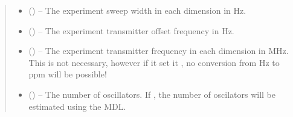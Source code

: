 \documentclass[letterpaper,10pt,english]{sphinxmanual}
\begin{document}
\begin{fulllineitems}
\begin{quote}
\begin{description}
\begin{itemize}
\item {} 
\sphinxAtStartPar
{} (\sphinxstyleliteralemphasis{\sphinxupquote{{[}}}\sphinxstyleliteralemphasis{\sphinxupquote{{]} or }}\sphinxstyleliteralemphasis{\sphinxupquote{{[}}}\sphinxstyleliteralemphasis{\sphinxupquote{, }}\sphinxstyleliteralemphasis{\sphinxupquote{{]}}}) – The experiment sweep width in each dimension in Hz.

\item {} 
\sphinxAtStartPar
{} (\sphinxstyleliteralemphasis{\sphinxupquote{{[}}}\sphinxstyleliteralemphasis{\sphinxupquote{{]}}}\sphinxstyleliteralemphasis{\sphinxupquote{, }}\sphinxstyleliteralemphasis{\sphinxupquote{{[}}}\sphinxstyleliteralemphasis{\sphinxupquote{, }}\sphinxstyleliteralemphasis{\sphinxupquote{{]} or }}\sphinxstyleliteralemphasis{\sphinxupquote{, }}) – The experiment transmitter offset frequency in Hz.

\item {} 
\sphinxAtStartPar
{} (\sphinxstyleliteralemphasis{\sphinxupquote{{[}}}\sphinxstyleliteralemphasis{\sphinxupquote{{]}}}\sphinxstyleliteralemphasis{\sphinxupquote{, }}\sphinxstyleliteralemphasis{\sphinxupquote{{[}}}\sphinxstyleliteralemphasis{\sphinxupquote{, }}\sphinxstyleliteralemphasis{\sphinxupquote{{]} or }}\sphinxstyleliteralemphasis{\sphinxupquote{, }}) – The experiment transmitter frequency in each dimension in MHz. This is
not necessary, however if it set it , no conversion from Hz
to ppm will be possible!

\item {} 
\sphinxAtStartPar
{} (\sphinxstyleliteralemphasis{\sphinxupquote{, }}) – The number of oscillators. If , the number of oscilators will
be estimated using the MDL.


\end{itemize}
\end{description}
\end{quote}
\end{fulllineitems}
\end{document}
